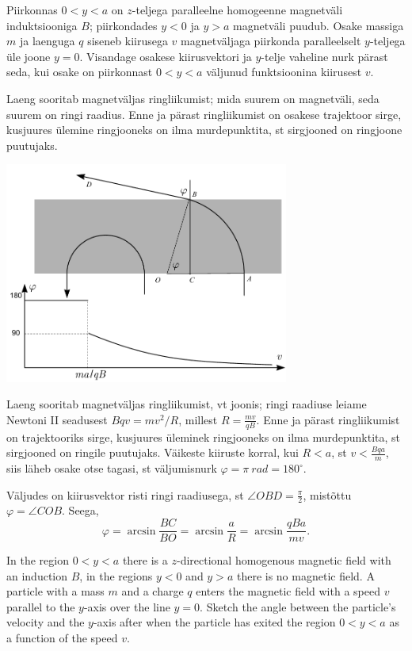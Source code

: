 
Piirkonnas $0<y<a$ on $z$-teljega paralleelne homogeenne magnetväli induktsiooniga $B$; piirkondades $y<0$ ja $y>a$ magnetväli puudub. 
Osake massiga $m$ ja laenguga $q$ siseneb kiirusega $v$ magnetväljaga piirkonda paralleelselt $y$-teljega üle joone $y=0$. Visandage osakese kiirusvektori ja $y$-telje vaheline nurk pärast seda, kui osake on piirkonnast $0<y<a$ väljunud funktsioonina kiirusest $v$.

\hint
Laeng sooritab magnetväljas ringliikumist; mida suurem on magnetväli, seda suurem on ringi raadius. Enne ja pärast ringliikumist on osakese trajektoor sirge, kusjuures ülemine ringjooneks on ilma murdepunktita, st sirgjooned on ringjoone puutujaks.

\solu
\begin{center}
\includegraphics[width=0.7\textwidth]{2015-v2g-09-magnetvalilah}
\end{center}
Laeng sooritab magnetväljas ringliikumist, vt joonis;
ringi raadiuse leiame Newtoni II seadusest $Bqv=mv^2/R$, millest
$R=\frac{mv}{qB}$. Enne ja pärast ringliikumist on trajektooriks sirge, kusjuures üleminek ringjooneks on ilma murdepunktita, st sirgjooned on ringile puutujaks. Väikeste kiiruste korral, kui $R<a$, st $v<\frac{Bqa}{m}$, siis läheb osake otse tagasi,
st väljumisnurk $\varphi=\pi \SI{}{rad}=180^\circ$.

Väljudes on kiirusvektor risti ringi raadiusega, st $\angle OBD=\frac \pi 2$, mistõttu $\varphi=\angle COB$. Seega,
\[
\varphi=\arcsin \frac{BC}{BO}=\arcsin \frac{a}{R}=\arcsin \frac{qBa}{mv}.
\]

In the region $0<y<a$ there is a $z$-directional homogenous magnetic field with an induction $B$, in the regions $y<0$ and $y>a$ there is no magnetic field. A particle with a mass $m$ and a charge $q$ enters the magnetic field with a speed $v$ parallel to the $y$-axis over the line $y=0$. Sketch the angle between the particle’s velocity and the $y$-axis after when the particle has exited the region $0<y<a$ as a function of the speed $v$.

